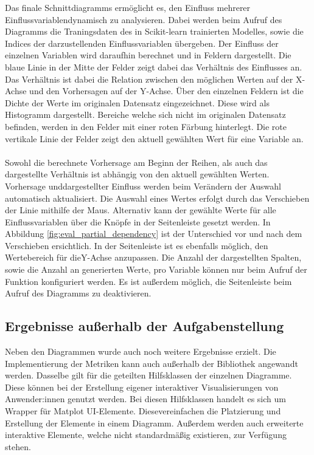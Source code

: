 \noindent Das finale Schnittdiagramms ermöglicht es, den Einfluss mehrerer Einflussvariablen\linebreak dynamisch zu analysieren. Dabei werden beim Aufruf des Diagramms die Traningsdaten des in Scikit-learn trainierten Modelles, sowie die Indices der darzustellenden Einflussvariablen übergeben. Der Einfluss der einzelnen Variablen wird daraufhin berechnet und in Feldern dargestellt. Die blaue Linie in der Mitte der Felder zeigt dabei das Verhältnis des Einflusses an. Das Verhältnis ist dabei die Relation zwischen den möglichen Werten auf der X-Achse und den Vorhersagen auf der Y-Achse. Über den einzelnen Feldern ist die Dichte der Werte im originalen Datensatz eingezeichnet. Diese wird als Histogramm dargestellt. Bereiche welche sich nicht im originalen Datensatz befinden, werden in den Felder mit einer roten Färbung hinterlegt. Die rote vertikale Linie der Felder zeigt den aktuell gewählten Wert für eine Variable an.\\\\
\noindent Sowohl die berechnete Vorhersage am Beginn der Reihen, als auch das dargestellte Verhältnis ist abhängig von den aktuell gewählten Werten. Vorhersage und\linebreak dargestellter Einfluss werden beim Verändern der Auswahl automatisch aktualisiert. Die Auswahl eines Wertes erfolgt durch das Verschieben der Linie mithilfe der Maus. Alternativ kann der gewählte Werte für alle Einflussvariablen über die Knöpfe in der Seitenleiste gesetzt werden. In Abbildung \ref{fig:eval_partial_dependency} ist der Unterschied vor und nach dem Verschieben ersichtlich. In der Seitenleiste ist es ebenfalls möglich, den Wertebereich für die\linebreak Y-Achse anzupassen. Die Anzahl der dargestellten Spalten, sowie die Anzahl an generierten Werte, pro Variable können nur beim Aufruf der Funktion konfiguriert werden. Es ist außerdem möglich, die Seitenleiste beim Aufruf des Diagramms zu deaktivieren.

\pagebreak

\subsection{Ergebnisse außerhalb der Aufgabenstellung}
\label{subsec:eval_other_results}

\noindent Neben den Diagrammen wurde auch noch weitere Ergebnisse erzielt. Die Implementierung der Metriken kann auch außerhalb der Bibliothek angewandt werden. Dasselbe gilt für die geteilten Hilfsklassen der einzelnen Diagramme. Diese können bei der Erstellung eigener interaktiver Visualisierungen von Anwender:innen genutzt werden. Bei diesen Hilfsklassen handelt es sich um Wrapper für Matplot UI-Elemente. Diese\linebreak vereinfachen die Platzierung und Erstellung der Elemente in einem Diagramm. Außerdem werden auch erweiterte interaktive Elemente, welche nicht standardmäßig existieren, zur Verfügung stehen.

